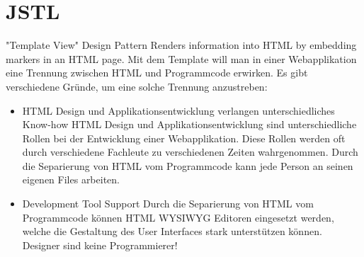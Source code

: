 \documentclass[a4paper,10pt]{scrreprt}
\begin{document}
\chapter{JSTL}
"Template View" Design Pattern
Renders information into HTML by embedding markers in an HTML page.
Mit dem Template will man in einer Webapplikation eine Trennung zwischen HTML und
Programmcode erwirken. Es gibt verschiedene Gründe, um eine solche Trennung anzustreben:
\begin{itemize}
\item HTML Design und Applikationsentwicklung verlangen unterschiedliches Know-how
   HTML Design und Applikationsentwicklung sind unterschiedliche Rollen bei der Entwicklung
  einer Webapplikation. Diese Rollen werden oft durch verschiedene Fachleute zu verschiedenen
 Zeiten wahrgenommen. Durch die Separierung von HTML vom Programmcode kann jede
Person an seinen eigenen Files arbeiten.
\item Development Tool Support
   Durch die Separierung von HTML vom Programmcode können HTML WYSIWYG Editoren
   eingesetzt werden, welche die Gestaltung des User Interfaces stark unterstützen können.
    Designer sind keine Programmierer!
\end{itemize}
\end{document}

